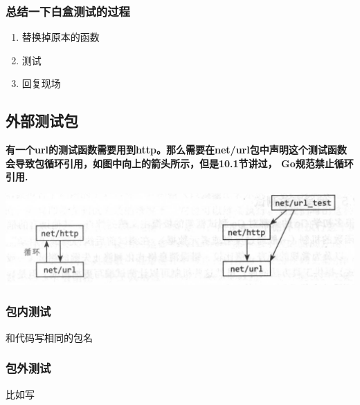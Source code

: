 \hypertarget{ux603bux7ed3ux4e00ux4e0bux767dux76d2ux6d4bux8bd5ux7684ux8fc7ux7a0b}{%
\subsubsection{总结一下白盒测试的过程}\label{ux603bux7ed3ux4e00ux4e0bux767dux76d2ux6d4bux8bd5ux7684ux8fc7ux7a0b}}

\begin{enumerate}
\tightlist
\item
  替换掉原本的函数
\item
  测试
\item
  回复现场
\end{enumerate}

\hypertarget{ux5916ux90e8ux6d4bux8bd5ux5305}{%
\subsection{外部测试包}\label{ux5916ux90e8ux6d4bux8bd5ux5305}}

\textbf{有一个url的测试函数需要用到http。那么需要在net/url包中声明这个测试函数会导致包循环引用，如图中向上的箭头所示，但是10.1节讲过，
Go规范禁止循环引用.}

\includegraphics{./ch11/xunhuan.png}

\hypertarget{ux5305ux5185ux6d4bux8bd5}{%
\subsubsection{包内测试}\label{ux5305ux5185ux6d4bux8bd5}}

和代码写相同的包名

\hypertarget{ux5305ux5916ux6d4bux8bd5}{%
\subsubsection{包外测试}\label{ux5305ux5916ux6d4bux8bd5}}

比如写

\begin{Shaded}
\begin{Highlighting}[]
\end{Highlighting}
\end{Shaded}


